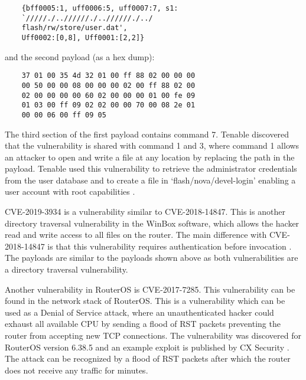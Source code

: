 \begin{verbatim}
    {bff0005:1, uff0006:5, uff0007:7, s1: 
    `/////./..//////./..//////./../
    flash/rw/store/user.dat', 
    Uff0002:[0,8], Uff0001:[2,2]}
\end{verbatim}

and the second payload (as a hex dump):

\begin{verbatim}
    37 01 00 35 4d 32 01 00 ff 88 02 00 00 00
    00 50 00 00 08 00 00 00 02 00 ff 88 02 00
    02 00 00 00 00 60 02 00 00 00 01 00 fe 09 
    01 03 00 ff 09 02 02 00 00 70 00 08 2e 01 
    00 00 06 00 ff 09 05
\end{verbatim}

The third section of the first payload contains command 7. Tenable discovered that the vulnerability is shared with command 1 and 3, where command 1 allows an attacker to open and write a file at any location by replacing the path in the payload. Tenable used this vulnerability to retrieve the administrator credentials from the user database and to create a file in `flash/nova/devel-login' enabling a user account with root capabilities \cite{CVE-2018-14847:TENABLE:2018}.

CVE-2019-3934 is a vulnerability similar to CVE-2018-14847. This is another directory traversal vulnerability in the WinBox software, which allows the hacker read and write access to all files on the router. The main difference with CVE-2018-14847 is that this vulnerability requires authentication before invocation \cite{CVE-2019-3943:TENABLE:2019}. The payloads are similar to the payloads shown above as both vulnerabilities are a directory traversal vulnerability.

Another vulnerability in RouterOS is CVE-2017-7285. This vulnerability can be found in the network stack of RouterOS. This is a vulnerability which can be used as a Denial of Service attack, where an unauthenticated hacker could exhaust all available CPU by sending a flood of RST packets preventing the router from accepting new TCP connections. The vulnerability was discovered for RouterOS version 6.38.5 and an example exploit is published by CX Security \cite{CVE-2017-7285:CXSECURIITY:2017}. The attack can be recognized by a flood of RST packets after which the router does not receive any traffic for minutes.
